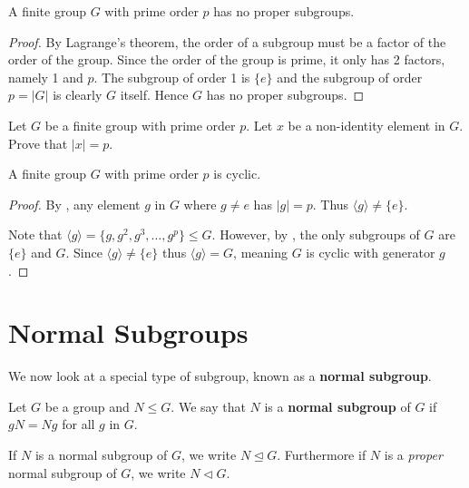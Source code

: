 \newpage

\begin{corollary}\label{corollary-group-with-prime-order-subgroups}
    A finite group $G$ with prime order $p$ has no proper subgroups.
\end{corollary}
\begin{proof}
    By Lagrange's theorem, the order of a subgroup must be a factor of the order of the group. Since the order of the group is prime, it only has 2 factors, namely 1 and $p$. The subgroup of order 1 is $\{e\}$ and the subgroup of order $p = |G|$ is clearly $G$ itself. Hence $G$ has no proper subgroups.
\end{proof}

\begin{exercise}\label{exercise-prime-order-element}
    Let $G$ be a finite group with prime order $p$. Let $x$ be a non-identity element in $G$. Prove that $|x| = p$.
\end{exercise}

\begin{corollary}\label{corollary-group-with-prime-order-is-cyclic}
    A finite group $G$ with prime order $p$ is cyclic.
\end{corollary}
\begin{proof}
    By , any element $g$ in $G$ where $g \neq e$ has $|g| = p$. Thus $\langle g \rangle \neq \{e\}$.

    Note that $\langle g \rangle = \{g, g^2, g^3, \dots, g^p\} \leq G$. However, by , the only subgroups of $G$ are $\{e\}$ and $G$. Since $\langle g \rangle \neq \{e\}$ thus $\langle g \rangle = G$, meaning $G$ is cyclic with generator $g$.
\end{proof}

\section{Normal Subgroups}
We now look at a special type of subgroup, known as a \textbf{normal subgroup}.
\begin{definition}
    Let $G$ be a group and $N \leq G$. We say that $N$ is a \textbf{normal subgroup} of $G$ if $gN = Ng$ for all $g$ in $G$.
\end{definition}
If $N$ is a normal subgroup of $G$, we write $N \unlhd G$. Furthermore if $N$ is a \textit{proper} normal subgroup of $G$, we write $N \lhd G$.

\newpage

